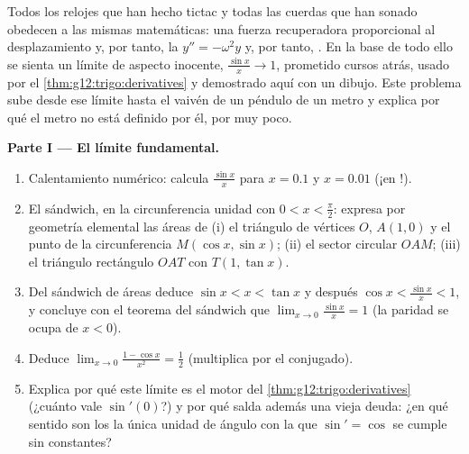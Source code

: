 \begin{problem}
\label{pb:g12:trigo:1}
Todos los relojes que han hecho tictac y todas las cuerdas que han sonado
obedecen a las mismas matemáticas: una fuerza recuperadora proporcional al
desplazamiento y, por tanto, la  $y'' = -\omega^2 y$ y, por tanto,
. En la base de todo ello se sienta un límite de aspecto inocente,
$\frac{\sin x}{x} \to 1$, prometido cursos atrás, usado por el
\cref{thm:g12:trigo:derivatives} y demostrado aquí con un dibujo. Este
problema sube desde ese límite hasta el vaivén de un péndulo de un metro y
explica por qué el metro no está definido por él, por muy poco.

\medskip
\noindent\textbf{Parte I --- El límite fundamental.}
\begin{enumerate}
  \item Calentamiento numérico: calcula $\frac{\sin x}{x}$ para $x = 0.1$ y
        $x = 0.01$ (¡en !).
  \item El sándwich, en la circunferencia unidad con
        $0 < x < \frac\pi2$: expresa por geometría elemental las áreas de
        (i) el triángulo de vértices $O$, $A(1,0)$ y el punto de la
        circunferencia $M(\cos x, \sin x)$; (ii) el sector circular $OAM$;
        (iii) el triángulo rectángulo $OAT$ con $T(1, \tan x)$.
  \item Del sándwich de áreas deduce $\sin x < x < \tan x$ y después
        $\cos x < \frac{\sin x}{x} < 1$, y concluye con el teorema del
        sándwich que $\lim_{x \to 0} \frac{\sin x}{x} = 1$ (la paridad se
        ocupa de $x < 0$).
  \item Deduce $\lim_{x \to 0} \frac{1 - \cos x}{x^2} = \frac12$
        (multiplica por el conjugado).
  \item Explica por qué este límite es el motor del
        \cref{thm:g12:trigo:derivatives} (¿cuánto vale $\sin'(0)$?) y por
        qué salda además una vieja deuda: ¿en qué sentido son los
        \emph{} la única unidad de ángulo con la que
        $\sin' = \cos$ se cumple sin constantes?
\end{enumerate}


\end{problem}

